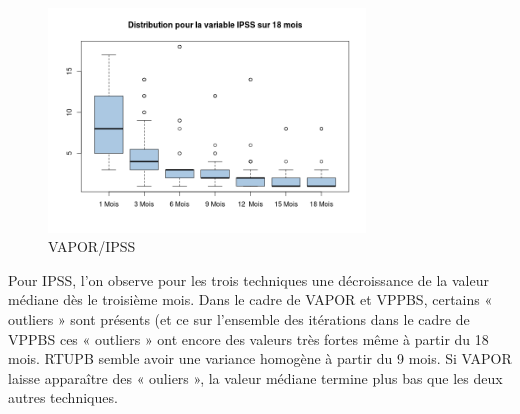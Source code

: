 \begin{figure}[H]
\centering
\includegraphics[width=0.75\textwidth]{../Fig/VAPOR/vapor-boxplot-post-ipss}
\caption{VAPOR/IPSS}
\end{figure}

%

Pour IPSS, l’on observe pour les trois techniques une décroissance de la valeur médiane dès le troisième mois. Dans le cadre de VAPOR et VPPBS, certains « outliers » sont présents (et ce sur l’ensemble des itérations dans le cadre de VPPBS ces « outliers » ont encore des valeurs très fortes même à partir du 18 mois.  RTUPB  semble avoir une variance homogène à partir du 9 mois. Si VAPOR laisse apparaître des « ouliers », la valeur médiane termine plus bas que les deux autres techniques. 
